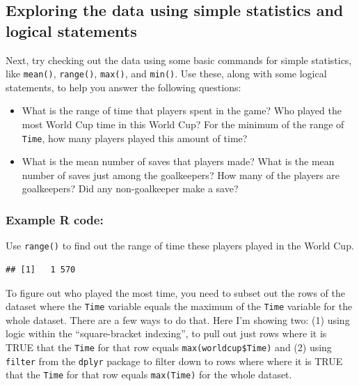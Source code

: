 \documentclass[]{book}
\makeatletter
\newenvironment{Shaded}{\begin{snugshade}}{\end{snugshade}}
\newcommand{\KeywordTok}[1]{\textcolor[rgb]{0.13,0.29,0.53}{\textbf{{#1}}}}
\newcommand{\NormalTok}[1]{{#1}}
\providecommand{\tightlist}{%
  \setlength{\itemsep}{0pt}\setlength{\parskip}{0pt}}
\newenvironment{kframe}{%
\medskip{}
\setlength{\fboxsep}{.8em}
 \def\at@end@of@kframe{}%
 \ifinner\ifhmode%
  \def\at@end@of@kframe{\end{minipage}}%
  \begin{minipage}{\columnwidth}%
 \fi\fi%
 \def\FrameCommand##1{\hskip\@totalleftmargin \hskip-\fboxsep
 \colorbox{shadecolor}{##1}\hskip-\fboxsep
     \hskip-\linewidth \hskip-\@totalleftmargin \hskip\columnwidth}%
 \MakeFramed {\advance\hsize-\width
   \@totalleftmargin\z@ \linewidth\hsize
   \@setminipage}}%
 {\par\unskip\endMakeFramed%
 \at@end@of@kframe}
\renewenvironment{Shaded}{\begin{kframe}}{\end{kframe}}
\makeatother
\begin{document}
\subsection{Exploring the data using simple statistics and logical
statements}\label{exploring-the-data-using-simple-statistics-and-logical-statements}

Next, try checking out the data using some basic commands for simple
statistics, like \texttt{mean()}, \texttt{range()}, \texttt{max()}, and
\texttt{min()}. Use these, along with some logical statements, to help
you answer the following questions:

\begin{itemize}
\tightlist
\item
  What is the range of time that players spent in the game? Who played
  the most World Cup time in this World Cup? For the minimum of the
  range of \texttt{Time}, how many players played this amount of time?
\item
  What is the mean number of saves that players made? What is the mean
  number of saves just among the goalkeepers? How many of the players
  are goalkeepers? Did any non-goalkeeper make a save?
\end{itemize}

\subsubsection{Example R code:}\label{example-r-code-2}

Use \texttt{range()} to find out the range of time these players played
in the World Cup.

\begin{Shaded}
\end{Shaded}

\begin{verbatim}
## [1]   1 570
\end{verbatim}

To figure out who played the most time, you need to subset out the rows
of the dataset where the \texttt{Time} variable equals the maximum of
the \texttt{Time} variable for the whole dataset. There are a few ways
to do that. Here I'm showing two: (1) using logic within the
``square-bracket indexing'', to pull out just rows where it is TRUE that
the \texttt{Time} for that row equals \texttt{max(worldcup\$Time)} and
(2) using \texttt{filter} from the \texttt{dplyr} package to filter down
to rows where where it is TRUE that the \texttt{Time} for that row
equals \texttt{max(Time)} for the whole dataset.
\end{document}
